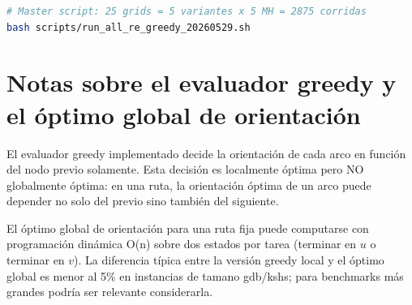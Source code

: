 \begin{lstlisting}[language=bash]
# Master script: 25 grids = 5 variantes x 5 MH = 2875 corridas
bash scripts/run_all_re_greedy_20260529.sh
\end{lstlisting}

\section{Notas sobre el evaluador greedy y el óptimo global de orientación}

El evaluador greedy implementado decide la orientación de cada arco en
función del nodo previo solamente. Esta decisión es localmente óptima
pero NO globalmente óptima: en una ruta, la orientación óptima de un
arco puede depender no solo del previo sino también del siguiente.

El óptimo global de orientación para una ruta fija puede computarse
con programación dinámica O(n) sobre dos estados por tarea (terminar
en $u$ o terminar en $v$). La diferencia típica entre la versión
greedy local y el óptimo global es menor al 5\% en instancias de
tamano gdb/kshs; para benchmarks más grandes podría ser relevante
considerarla.
